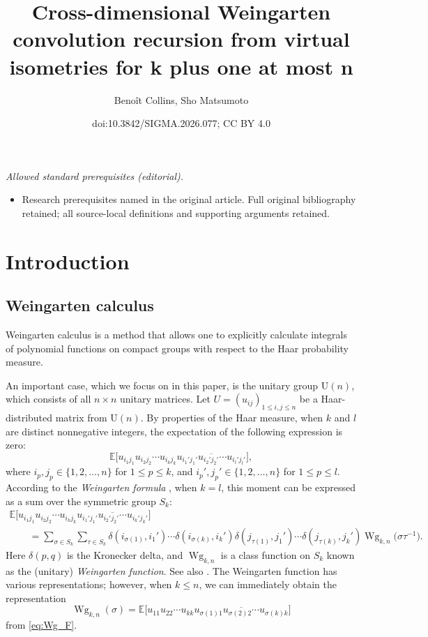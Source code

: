 \documentclass[10pt,a4paper]{amsart}
\title{Cross-dimensional Weingarten convolution recursion from virtual isometries for k plus one at most n}
\author{Benoît Collins, Sho Matsumoto}
\date{doi:10.3842/SIGMA.2026.077; CC BY 4.0}
\numberwithin{equation}{section}
\theoremstyle{definition}
\newcommand{\UU}{\mathrm{U}}
\DeclareMathOperator{\Wg}{Wg}
\begin{document}
\maketitle
\noindent\textit{Allowed standard prerequisites (editorial).}\begin{itemize}
\item Research prerequisites named in the original article. Full original bibliography retained; all source-local definitions and supporting arguments retained.
\end{itemize}\medskip
\section{Introduction}

\subsection{Weingarten calculus}

Weingarten calculus is a method that allows one to explicitly calculate integrals of polynomial functions on compact groups with respect to the Haar probability measure.

An important case, which we focus on in this paper, is the unitary group
$\UU(n)$, which consists of all $n \times n$ unitary matrices.
Let $U=(u_{ij})_{1 \le i,j \le n}$ be a Haar-distributed matrix from $\UU(n)$.
By properties of the Haar measure, when $k$ and $l$ are distinct nonnegative integers, the expectation of the following expression is zero:
\[
\mathbb{E} \bigl[ u_{i_1 j_1} u_{i_2 j_2} \cdots u_{i_k j_k}
\overline{u_{i_1' j_1'} u_{i_2' j_2'}\cdots u_{i_l' j_l'}} \bigr],
\]
where $i_p,j_p \in \{1,2,\dots,n\}$ for $1 \le p \le k$, and $i_p',j_p' \in \{1,2,\dots,n\}$ for $1 \le p \le l$.
According to the \emph{Weingarten formula} \cite{Collins2003, CollinsSniady2006},
when $k=l$, this moment can be expressed as a sum over the symmetric group $S_k$:
\begin{gather}
 \mathbb{E} \bigl[ u_{i_1 j_1} u_{i_2 j_2} \cdots u_{i_k j_k}
\overline{u_{i_1' j_1'} u_{i_2' j_2'}\cdots u_{i_k' j_k'}} \bigr] \nonumber\\
\qquad =\sum_{\sigma \in S_k}\sum_{\tau\in S_k}
\delta(i_{\sigma(1)}, i_1')\cdots \delta(i_{\sigma(k)}, i_k')
\delta(j_{\tau(1)}, j_1')\cdots \delta(j_{\tau(k)}, j_k')
\Wg_{k,n}\bigl(\sigma \tau^{-1}\bigr).\label{eq:Wg_F}
\end{gather}
Here $\delta(p,q)$ is the Kronecker delta, and $\Wg_{k,n}$ is a class function on $S_k$ known as the (unitary)
\emph{Weingarten function}.
See also \cite{MR597583}.
The Weingarten function has various representations; however, when $k \le n$, we can
immediately obtain the representation
 \[
 \Wg_{k,n}(\sigma) = \mathbb{E} \bigl[ u_{11} u_{22} \cdots u_{kk}
 \overline{u_{\sigma(1)1} u_{\sigma(2)2} \cdots u_{\sigma(k)k}} \bigr]
 \]
from \eqref{eq:Wg_F}.
\end{document}
